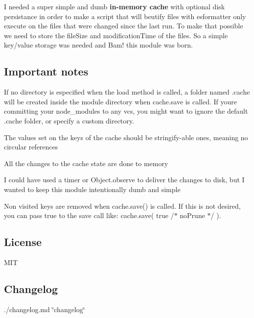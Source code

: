 I needed a super simple and dumb {\bfseries in-\/memory cache} with optional disk persistance in order to make a script that will beutify files with {\ttfamily esformatter} only execute on the files that were changed since the last run. To make that possible we need to store the {\ttfamily file\+Size} and {\ttfamily modification\+Time} of the files. So a simple {\ttfamily key/value} storage was needed and Bam! this module was born.

\subsection*{Important notes}


\begin{DoxyItemize}
\item If no directory is especified when the {\ttfamily load} method is called, a folder named {\ttfamily .cache} will be created inside the module directory when {\ttfamily cache.\+save} is called. If you\textquotesingle{}re committing your {\ttfamily node\+\_\+modules} to any vcs, you might want to ignore the default {\ttfamily .cache} folder, or specify a custom directory.
\item The values set on the keys of the cache should be {\ttfamily stringify-\/able} ones, meaning no circular references
\item All the changes to the cache state are done to memory
\item I could have used a timer or {\ttfamily Object.\+observe} to deliver the changes to disk, but I wanted to keep this module intentionally dumb and simple
\item Non visited keys are removed when {\ttfamily cache.\+save()} is called. If this is not desired, you can pass {\ttfamily true} to the save call like\+: {\ttfamily cache.\+save( true /$\ast$ no\+Prune $\ast$/ )}.
\end{DoxyItemize}

\subsection*{License}

M\+IT

\subsection*{Changelog}

./changelog.md \char`\"{}changelog\char`\"{} 
